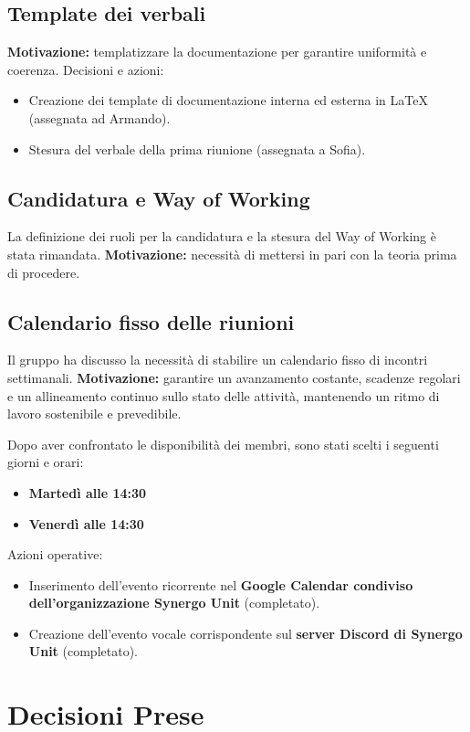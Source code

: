\subsection{Template dei verbali}
\textbf{Motivazione:} templatizzare la documentazione per garantire uniformità e coerenza.  
Decisioni e azioni:
\begin{itemize}
    \item Creazione dei template di documentazione interna ed esterna in LaTeX (assegnata ad Armando).
    \item Stesura del verbale della prima riunione (assegnata a Sofia).
\end{itemize}

\subsection{Candidatura e Way of Working}
La definizione dei ruoli per la candidatura e la stesura del Way of Working è stata rimandata.  
\textbf{Motivazione:} necessità di mettersi in pari con la teoria prima di procedere.

\subsection{Calendario fisso delle riunioni}
Il gruppo ha discusso la necessità di stabilire un calendario fisso di incontri settimanali.  
\textbf{Motivazione:} garantire un avanzamento costante, scadenze regolari e un allineamento continuo sullo stato delle attività, mantenendo un ritmo di lavoro sostenibile e prevedibile.

Dopo aver confrontato le disponibilità dei membri, sono stati scelti i seguenti giorni e orari:
\begin{itemize}
    \item \textbf{Martedì alle 14:30}
    \item \textbf{Venerdì alle 14:30}
\end{itemize}

Azioni operative:
\begin{itemize}
    \item Inserimento dell’evento ricorrente nel \textbf{Google Calendar condiviso dell’organizzazione Synergo Unit} (completato).
    \item Creazione dell’evento vocale corrispondente sul \textbf{server Discord di Synergo Unit} (completato).
\end{itemize}

\section{Decisioni Prese}

